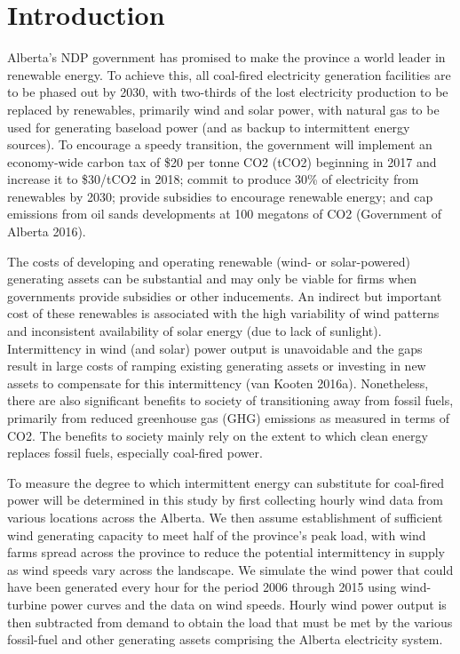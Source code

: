 \section{Introduction}
\label{sec:introduction}




Alberta’s NDP government has promised to make the province a world leader in renewable energy. To achieve this, all coal-fired electricity generation facilities are to be phased out by 2030, with two-thirds of the lost electricity production to be replaced by renewables, primarily wind and solar power, with natural gas to be used for generating baseload power (and as backup to intermittent energy sources). To encourage a speedy transition, the government will implement an economy-wide carbon tax of \$20 per tonne CO2 (tCO2) beginning in 2017 and increase it to \$30/tCO2 in 2018; commit to produce 30\% of electricity from renewables by 2030; provide subsidies to encourage renewable energy; and cap emissions from oil sands developments at 100 megatons of CO2 (Government of Alberta 2016). 


The costs of developing and operating renewable (wind- or solar-powered) generating assets can be substantial and may only be viable for firms when governments provide subsidies or other inducements. An indirect but important cost of these renewables is associated with the high variability of wind patterns and inconsistent availability of solar energy (due to lack of sunlight). Intermittency in wind (and solar) power output is unavoidable and the gaps result in large costs of ramping existing generating assets or investing in new assets to compensate for this intermittency (van Kooten 2016a).  Nonetheless, there are also significant benefits to society of transitioning away from fossil fuels, primarily from reduced greenhouse gas (GHG) emissions as measured in terms of CO2. The benefits to society mainly rely on the extent to which clean energy replaces fossil fuels, especially coal-fired power.  


To measure the degree to which intermittent energy can substitute for coal-fired power will be determined in this study by first collecting hourly wind data from various locations across the Alberta. We then assume establishment of sufficient wind generating capacity to meet half of the province’s peak load, with wind farms spread across the province to reduce the potential intermittency in supply as wind speeds vary across the landscape. We simulate the wind power that could have been generated every hour for the period 2006 through 2015 using wind-turbine power curves and the data on wind speeds. Hourly wind power output is then subtracted from demand to obtain the load that must be met by the various fossil-fuel and other generating assets comprising the Alberta electricity system. 


